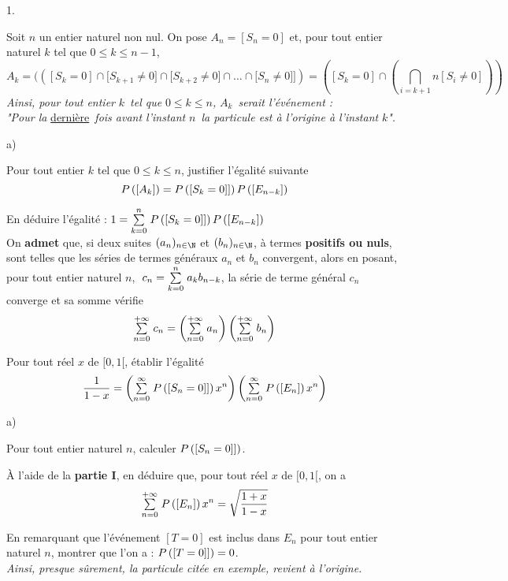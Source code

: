 \documentclass[11pt]{article}%
\begin{document}
\begin{noliste}{1.}
 \setlength{\itemsep}{4mm}
\item Soit $n$ un entier naturel non nul. On pose $A_{n} = [S_{n} = 0]$
et, pour
tout entier naturel $k$ tel que $0\leq k\leq n-1$, 
\[
A_{k} = (([S_{k} = 0]\cap \lbrack S_{k + 1}\not = 0]\cap \lbrack S_{k +
2}\not = 0]\cap
\dots \cap \lbrack S_{n}\not = 0]]) = ([S_{k} = 0]\cap
(\bigcap_{i = k + 1}{n}[S_{i}\not = 0]))
\]
\textit{Ainsi, pour tout entier }$k$\textit{\ tel que }$0\leq
k\leq n$\textit{, }$A_{k}$\textit{\ serait l'événement : }\\
\textit{"Pour la }\underline{dernière}\textit{\ fois avant l'instant
}$n$\textit{\ la particule est à l'origine à l'instant }$k$\textit{".}

\begin{noliste}{a)}
 \setlength{\itemsep}{2mm}
\item Pour tout entier $k$ tel que $0\leq k\leq n$, justifier l'égalité
suivante 
\[
P\left(\left[ {A_{k}} \right]\right) = P\left(\left[ {S_{k} =
0]} \right]\right)P\left(\left[ {E_{n-k}} \right]\right)
\]

\item En déduire l'égalité : $1 = {\textstyle\sum\limits_{k = 0}^{n}}\hspace{.1cm}P\left(\left[ {S_{k} =
0]} \right]\right)P\left(\left[ {E_{n-k}} \right]\right)$\\
On \textbf{admet} que, si deux suites $(a_{n})_{n\in \N}$ et
$(b_{n})_{n\in \N}$, à termes \textbf{positifs ou nuls}, sont telles
que les séries de termes généraux $a_{n}$ et $b_{n}$ convergent, alors
en
posant, pour tout entier naturel $n$, $\;c_{n} = {\textstyle\sum\limits_{k =
0}^{n}}\hspace{.1cm}a_{k}b_{n-k}$, la série de terme général $c_{n}$ converge
et sa somme vérifie 
\[
{\textstyle\sum\limits_{n = 0}^{+ \infty }}\hspace{.1cm}c_{n} = \left( {\textstyle\sum\limits_{n = 0}^{+ \infty }}\hspace{.1cm}a_{n}\right)
\left(
{\textstyle\sum\limits_{n = 0}^{+ \infty }}\hspace{.1cm}b_{n}\right)
\]
\end{noliste}

\item Pour tout réel $x$ de $[0,1[$, établir l'égalité 
\[
\dfrac{1}{1-x} = \left( {\textstyle\sum\limits_{n = 0}^{\infty }}\hspace{.1cm}P\left(\left[ {S_{n} =
0]} \right]\right)x^{n}\right) \left(
{\textstyle\sum\limits_{n = 0}^{\infty }}\hspace{.1cm}P\left(\left[ {E_{n}} \right]\right)x^{n}\right)
\]

\item 

\begin{noliste}{a)}
 \setlength{\itemsep}{2mm}
\item Pour tout entier naturel $n$, calculer $P\left(\left[ {S_{n} =
0]} \right]\right)$.

\item À l'aide de la \textbf{partie I}, en déduire que, pour tout réel
$x$
de $[0,1[$, on a 
\[
{\textstyle\sum\limits_{n = 0}^{+ \infty }}\hspace{.1cm}P\left(\left[ {E_{n}} \right]\right)x^{n} = \sqrt{\dfrac{1 +
x}{1-x}}
\]

\item En remarquant que l'événement $[T = 0]$ est inclus dans $E_{n}$
pour
tout entier naturel $n$, montrer que l'on a : $P\left(\left[ {T =
0]} \right]\right) = 0$.\\
\textit{Ainsi, presque sûrement, la particule citée en exemple, revient
à
l'origine.}
\end{noliste}
\end{noliste}
\end{document}
